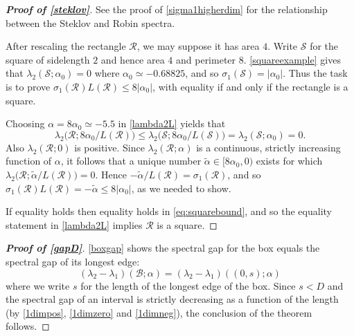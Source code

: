 \documentclass[12pt,reqno]{amsart}
\theoremstyle{definition}
\begin{document}
%
\begin{proof}[\bf Proof of \autoref{steklov}]
See the proof of \autoref{sigma1higherdim} for the relationship between the Steklov and Robin spectra. 

After rescaling the rectangle $\mathcal{R}$, we may suppose it has area $4$. Write $\mathcal{S}$ for the square of sidelength $2$ and hence area $4$ and perimeter $8$. \autoref{squareexample} gives that $\lambda_2(\mathcal{S};\alpha_0)=0$ where $\alpha_0 \simeq -0.68825$, and so $\sigma_1(\mathcal{S})= |\alpha_0|$. Thus the task is to prove $\sigma_1(\mathcal{R}) L(\mathcal{R}) \leq 8|\alpha_0|$, with equality if and only if the rectangle is a square. 

Choosing $\alpha= 8\alpha_0 \simeq -5.5$ in \autoref{lambda2L} yields that 
%
\begin{equation} \label{eq:squarebound}
\lambda_2\big( \mathcal{R};8\alpha_0/L(\mathcal{R}) \big) \leq \lambda_2\big(\mathcal{S};8\alpha_0/L(\mathcal{S})\big) = \lambda_2(\mathcal{S};\alpha_0) =0 .
\end{equation}
%
Also $\lambda_2(\mathcal{R};0)$ is positive. Since $\lambda_2(\mathcal{R};\alpha)$ is a continuous, strictly increasing function of $\alpha$, it follows that a unique number $\widetilde{\alpha} \in [8\alpha_0,0)$ exists for which $\lambda_2\big( \mathcal{R};\widetilde{\alpha}/L(\mathcal{R}) \big) = 0$. Hence $-\widetilde{\alpha}/L(\mathcal{R})=\sigma_1(\mathcal{R})$, and so $\sigma_1(\mathcal{R}) L(\mathcal{R}) = -\widetilde{\alpha} \leq 8|\alpha_0|$, as we needed to show. 

If equality holds then equality holds in \eqref{eq:squarebound}, and so the equality statement in \autoref{lambda2L}  implies $\mathcal{R}$ is a square. 
\end{proof}
%

%
\begin{proof}[\bf Proof of \autoref{gapD}]
\autoref{boxgap} shows the spectral gap for the box equals the spectral gap of its longest edge:
\[
(\lambda_2-\lambda_1)(\mathcal{B};\alpha) = (\lambda_2-\lambda_1)((0,s);\alpha)
\]
where we write $s$ for the length of the longest edge of the box. Since $s<D$ and the spectral gap of an interval is strictly decreasing as a function of the length (by \autoref{1dimpos}, \autoref{1dimzero}  and \autoref{1dimneg}), the conclusion of the theorem follows. 
\end{proof}
%
\end{document}
